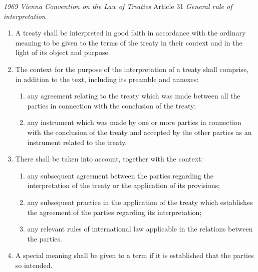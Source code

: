 \begin{conventiondetails}{\textit{1969 Vienna Convention on the Law of Treaties} Article 31}\label{VCLT Art 31}
    \flushleft
    \textit{General rule of interpretation}

    \begin{enumerate}
        \item A treaty shall be interpreted in good faith in accordance with the ordinary meaning to be given to the terms of the treaty in their context and in the light of its object and purpose. 
        \item The context for the purpose of the interpretation of a treaty shall comprise, in addition to the text, including its preamble and annexes:
        \begin{enumerate}[label=(\alph*)]
            \item any agreement relating to the treaty which was made between all the parties in connection with the conclusion of the treaty; 
            \item any instrument which was made by one or more parties in connection with the conclusion of the treaty and accepted by the other parties as an instrument related to the treaty. 
        \end{enumerate}
        \item There shall be taken into account, together with the context:
        \begin{enumerate}[label=(\alph*)]
            \item any subsequent agreement between the parties regarding the interpretation of the treaty or the application of its provisions; 
            \item any subsequent practice in the application of the treaty which establishes the agreement of the parties regarding its interpretation; 
            \item any relevant rules of international law applicable in the relations between the parties. 
        \end{enumerate}
        \item  A special meaning shall be given to a term if it is established that the parties so intended. 
    \end{enumerate}
\end{conventiondetails}

